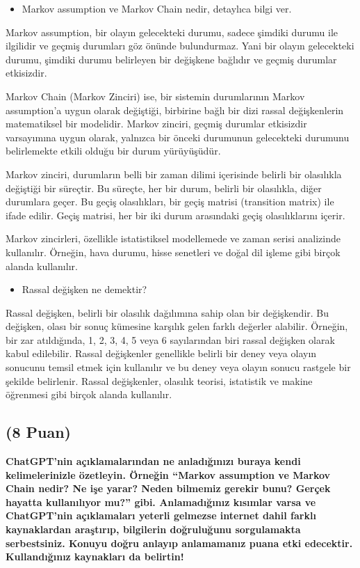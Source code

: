 \documentclass[11pt]{article}
\begin{document}
\begin{itemize}
    \item Markov assumption ve Markov Chain nedir, detaylıca bilgi ver.
\end{itemize}
Markov assumption, bir olayın gelecekteki durumu, sadece şimdiki durumu ile ilgilidir ve geçmiş durumları göz önünde bulundurmaz. Yani bir olayın gelecekteki durumu, şimdiki durumu belirleyen bir değişkene bağlıdır ve geçmiş durumlar etkisizdir.

Markov Chain (Markov Zinciri) ise, bir sistemin durumlarının Markov assumption'a uygun olarak değiştiği, birbirine bağlı bir dizi rassal değişkenlerin matematiksel bir modelidir. Markov zinciri, geçmiş durumlar etkisizdir varsayımına uygun olarak, yalnızca bir önceki durumunun gelecekteki durumunu belirlemekte etkili olduğu bir durum yürüyüşüdür.

Markov zinciri, durumların belli bir zaman dilimi içerisinde belirli bir olasılıkla değiştiği bir süreçtir. Bu süreçte, her bir durum, belirli bir olasılıkla, diğer durumlara geçer. Bu geçiş olasılıkları, bir geçiş matrisi (transition matrix) ile ifade edilir. Geçiş matrisi, her bir iki durum arasındaki geçiş olasılıklarını içerir.

Markov zincirleri, özellikle istatistiksel modellemede ve zaman serisi analizinde kullanılır. Örneğin, hava durumu, hisse senetleri ve doğal dil işleme gibi birçok alanda kullanılır.
\begin{itemize}
    \item Rassal değişken ne demektir?
\end{itemize}
Rassal değişken, belirli bir olasılık dağılımına sahip olan bir değişkendir. Bu değişken, olası bir sonuç kümesine karşılık gelen farklı değerler alabilir. Örneğin, bir zar atıldığında, 1, 2, 3, 4, 5 veya 6 sayılarından biri rassal değişken olarak kabul edilebilir. Rassal değişkenler genellikle belirli bir deney veya olayın sonucunu temsil etmek için kullanılır ve bu deney veya olayın sonucu rastgele bir şekilde belirlenir. Rassal değişkenler, olasılık teorisi, istatistik ve makine öğrenmesi gibi birçok alanda kullanılır.

\subsection{(8 Puan)} \textbf{ChatGPT’nin açıklamalarından ne anladığınızı buraya kendi kelimelerinizle özetleyin. Örneğin ``Markov assumption ve Markov Chain nedir? Ne işe yarar? Neden bilmemiz gerekir bunu? Gerçek hayatta kullanılıyor mu?'' gibi. Anlamadığınız kısımlar varsa ve ChatGPT’nin açıklamaları yeterli gelmezse internet dahil farklı kaynaklardan araştırıp, bilgilerin doğruluğunu sorgulamakta serbestsiniz. Konuyu doğru anlayıp anlamamanız puana etki edecektir. Kullandığınız kaynakları da belirtin!}
\end{document}
